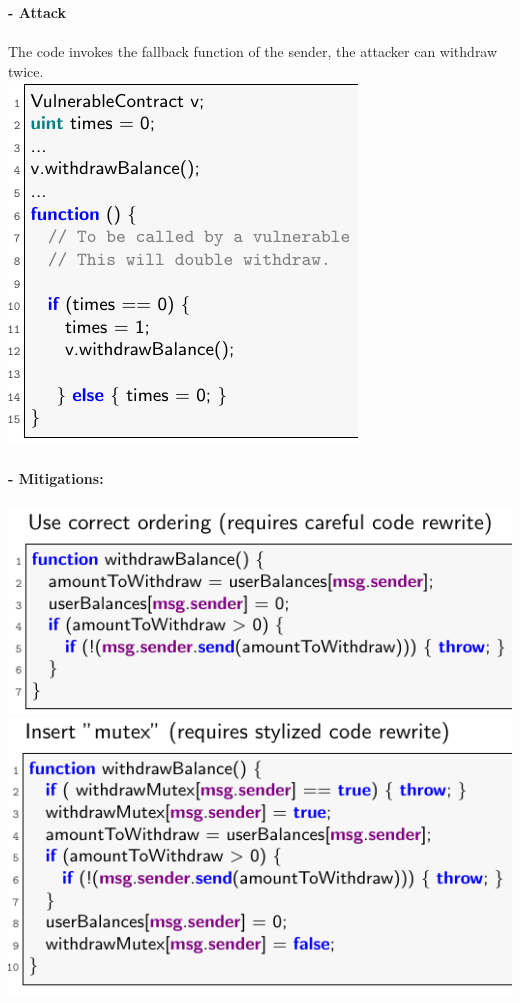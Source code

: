 \documentclass{article}
\begin{document}
\textbf{- Attack}\\\\
The code invokes the fallback function of the sender, the attacker can withdraw twice.\\
\includegraphics[scale=0.3]{88.png}\\\\
\textbf{- Mitigations: }\\\\
\includegraphics[scale=0.3]{89.png}
\includegraphics[scale=0.3]{90.png}
\end{document}
